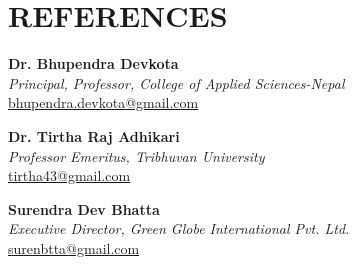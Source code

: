 \documentclass[a4paper,9pt]{extarticle}
\begin{document}
\section*{REFERENCES}
\noindent
\textbf{Dr. Bhupendra Devkota}\\
\textit{Principal, Professor, College of Applied Sciences-Nepal}\\
\href{mailto:bhupendra.devkota@gmail.com}{bhupendra.devkota@gmail.com}

\noindent
\textbf{Dr. Tirtha Raj Adhikari}\\
\textit{Professor Emeritus, Tribhuvan University}\\
\href{mailto:tirtha43@gmail.com}{tirtha43@gmail.com}

\noindent
\textbf{Surendra Dev Bhatta}\\
\textit{Executive Director, Green Globe International Pvt. Ltd.}\\
\href{mailto:surenbtta@gmail.com}{surenbtta@gmail.com}
\end{document}
